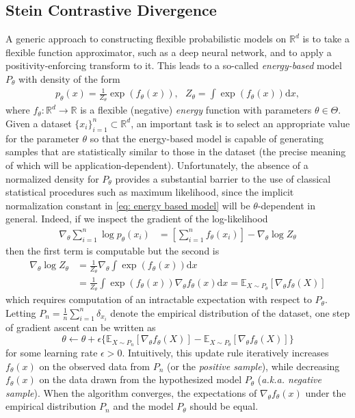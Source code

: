 \documentclass[12pt,paper=letter]{scrreprt}
\def\mbb#1{\mathbb{#1}}
\def\E{\mbb{E}} %
\newcommand{\df}{\mathrm{d}}
\newcommand{\vx}{x}
\newcommand{\vtheta}{\theta}
\begin{document}
\subsection{Stein Contrastive Divergence}
\label{sec:steincd}

A generic approach to constructing flexible probabilistic models on $\mathbb{R}^d$ is to take a flexible function approximator, such as a deep neural network, and to apply a positivity-enforcing transform to it.
This leads to a so-called \emph{energy-based} model $P_\theta$ with density of the form
\begin{align}
    p_\theta(x) =  \frac{1}{Z_\theta} \exp( f_\theta(x) ) , ~~~  Z_\theta = \int \exp(f_\theta(x))\df x, 
    \label{eq: energy based model} 
\end{align}
where $f_\theta : \mathbb{R}^d \rightarrow \mathbb{R}$ is a flexible (negative) \emph{energy} function with parameters $\theta \in \Theta$.
Given a dataset $\{x_i\}_{i = 1}^n \subset \mathbb{R}^d$, an important task is to select an appropriate value for the parameter $\theta$ so that the energy-based model is capable of generating samples that are statistically similar to those in the dataset (the precise meaning of which will be application-dependent).
Unfortunately, the absence of a normalized density for $P_\theta$ provides a substantial barrier to the use of classical statistical procedures such as maximum likelihood, since the implicit normalization constant in \eqref{eq: energy based model} will be $\theta$-dependent in general.
Indeed, if we inspect the gradient of the log-likelihood
\begin{align*}
    \nabla_\theta \sum_{i=1}^n \log p_\theta(x_i) & = \left[ \sum_{i=1}^n f_\theta(x_i) \right] - \nabla_\theta \log Z_\theta 
\end{align*}
then the first term is computable but the second is
\begin{align*}
    \nabla_\theta \log Z_\theta & = \frac{1}{Z_\theta} \nabla_\theta \int \exp(f_\theta(x)) \mathrm{d}x \\
    & = \frac{1}{Z_\theta} \int \exp(f_\theta(x)) \nabla_\theta f_\theta(x) \mathrm{d}x 
    = \mathbb{E}_{X \sim P_\theta}[\nabla_\theta f_\theta(X)]
\end{align*}
which requires computation of an intractable expectation with respect to $P_\theta$.
Letting $P_n = \frac{1}{n} \sum_{i=1}^n \delta_{x_i}$ denote the empirical distribution of the dataset, one step of gradient ascent can be written as
$$
\vtheta \gets \vtheta + \epsilon \{ \E_{X \sim P_n} [\nabla_\vtheta f_\theta (X)]  -  \E_{X \sim P_\theta} [\nabla_\vtheta f_\theta (X) ] \}
$$
for some learning rate $\epsilon > 0$.
Intuitively, this update rule iteratively increases $f_\theta(\vx)$  on the observed data from $P_n$ (or the \emph{positive sample}), while decreasing $f_\theta(\vx)$ on the data drawn from the hypothesized model $P_\theta$ (\emph{a.k.a. negative sample}).  
When the algorithm converges, the expectations of $\nabla_\vtheta f_\theta (x)$ under the empirical distribution $P_n$ and the model $P_\theta$ should be equal.  
\end{document}
